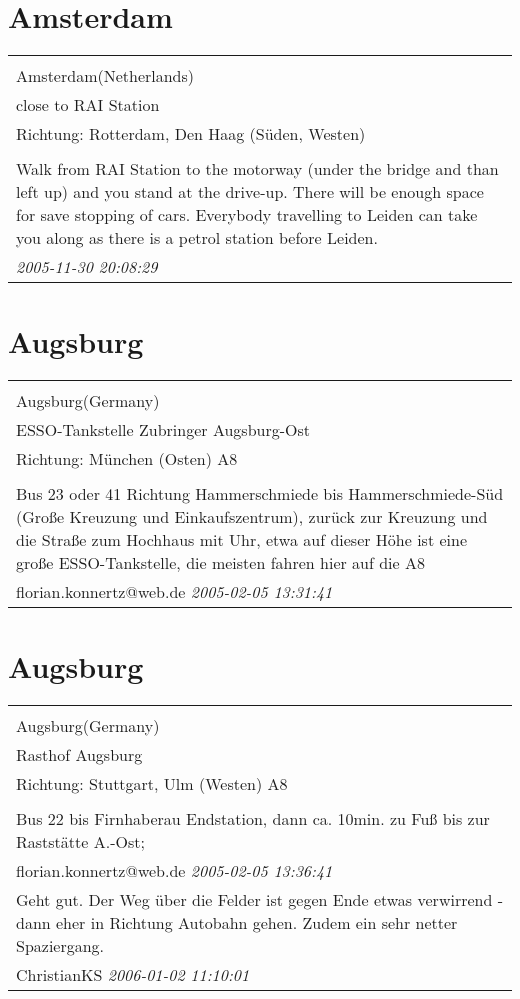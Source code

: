 \documentclass[a4paper,12pt]{article}
\begin{document}
\section{Amsterdam}
\begin{tabular}{|p{13cm}|}
\hline\\
Amsterdam(Netherlands)\\
close to RAI Station\\
Richtung: Rotterdam, Den Haag (Süden, Westen) \\
\hline\\
Walk from RAI Station to the motorway (under the bridge and than left up) and you stand at the drive-up. There will be enough space for save stopping of cars. Everybody travelling to Leiden can take you along as there is a petrol station before Leiden. \\
\textit{ 2005-11-30 20:08:29 }\\\hline
\end{tabular}


\section{Augsburg}
\begin{tabular}{|p{13cm}|}
\hline\\
Augsburg(Germany)\\
ESSO-Tankstelle Zubringer Augsburg-Ost\\
Richtung: München (Osten) A8 \\
\hline\\
Bus 23 oder 41 Richtung Hammerschmiede bis Hammerschmiede-Süd (Große Kreuzung und Einkaufszentrum), zurück zur Kreuzung und die Straße zum Hochhaus mit Uhr, etwa auf dieser Höhe ist eine große ESSO-Tankstelle, die meisten fahren hier auf die A8 \\
florian.konnertz@web.de \textit{ 2005-02-05 13:31:41 }\\\hline
\end{tabular}


\section{Augsburg}
\begin{tabular}{|p{13cm}|}
\hline\\
Augsburg(Germany)\\
Rasthof Augsburg\\
Richtung: Stuttgart, Ulm (Westen) A8 \\
\hline\\
Bus 22 bis Firnhaberau Endstation, dann ca. 10min. zu Fuß bis zur Raststätte A.-Ost; \\
florian.konnertz@web.de \textit{ 2005-02-05 13:36:41 }\\\hline Geht gut. Der Weg über die Felder ist gegen Ende etwas verwirrend - dann eher in Richtung Autobahn gehen. Zudem ein sehr netter Spaziergang. \\
ChristianKS \textit{ 2006-01-02 11:10:01 }\\\hline
\end{tabular}
\end{document}
